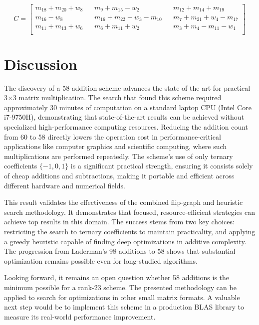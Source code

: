 \documentclass{article}
\begin{document}
\[
C = 
    \begin{bmatrix}
m_{18} + m_{20} + w_{8} && m_{9} + m_{15} - w_{2} && m_{12} + m_{14} + m_{19} \\
m_{16} - w_{8} && m_{16} + m_{22} + w_{3} - m_{10} && m_{7} + m_{21} + w_{4} - m_{17} \\
m_{11} + m_{13} + w_{6} && m_{6} + m_{11} + w_{2} && m_{3} + m_{4} - m_{11} - w_{1} \\
    \end{bmatrix}
\]

\section{Discussion}
\label{sec:discussion}

The discovery of a 58-addition scheme advances the state of the art for practical 3×3 matrix multiplication. The search that found this scheme required approximately 30 minutes of computation on a standard laptop CPU (Intel Core i7-9750H), demonstrating that state-of-the-art results can be achieved without specialized high-performance computing resources. Reducing the addition count from 60 to 58 directly lowers the operation cost in performance-critical applications like computer graphics and scientific computing, where such multiplications are performed repeatedly. The scheme's use of only ternary coefficients $\{-1, 0, 1\}$ is a significant practical strength, ensuring it consists solely of cheap additions and subtractions, making it portable and efficient across different hardware and numerical fields.

This result validates the effectiveness of the combined flip-graph and heuristic search methodology. It demonstrates that focused, resource-efficient strategies can achieve top results in this domain. The success stems from two key choices: restricting the search to ternary coefficients to maintain practicality, and applying a greedy heuristic capable of finding deep optimizations in additive complexity. The progression from Laderman's 98 additions to 58 shows that substantial optimization remains possible even for long-studied algorithms.

Looking forward, it remains an open question whether 58 additions is the minimum possible for a rank-23 scheme. The presented methodology can be applied to search for optimizations in other small matrix formats. A valuable next step would be to implement this scheme in a production BLAS library to measure its real-world performance improvement.
\end{document}
